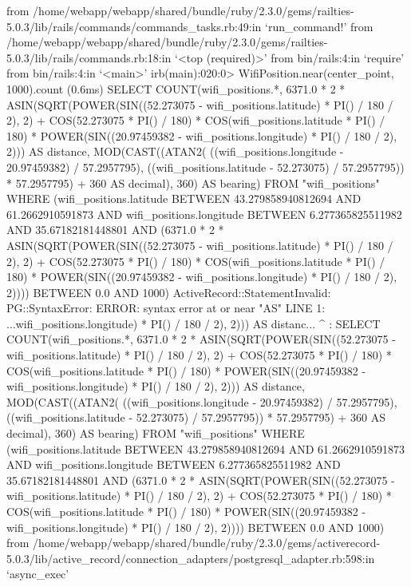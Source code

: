         from /home/webapp/webapp/shared/bundle/ruby/2.3.0/gems/railties-5.0.3/lib/rails/commands/commands_tasks.rb:49:in `run_command!'
        from /home/webapp/webapp/shared/bundle/ruby/2.3.0/gems/railties-5.0.3/lib/rails/commands.rb:18:in `<top (required)>'
        from bin/rails:4:in `require'
        from bin/rails:4:in `<main>'
irb(main):020:0> WifiPosition.near(center_point, 1000).count
   (0.6ms)  SELECT COUNT(wifi_positions.*, 6371.0 * 2 * ASIN(SQRT(POWER(SIN((52.273075 - wifi_positions.latitude) * PI() / 180 / 2), 2) + COS(52.273075 * PI() / 180) * COS(wifi_positions.latitude * PI() / 180) * POWER(SIN((20.97459382 - wifi_positions.longitude) * PI() / 180 / 2), 2))) AS distance, MOD(CAST((ATAN2( ((wifi_positions.longitude - 20.97459382) / 57.2957795), ((wifi_positions.latitude - 52.273075) / 57.2957795)) * 57.2957795) + 360 AS decimal), 360) AS bearing) FROM "wifi_positions" WHERE (wifi_positions.latitude BETWEEN 43.279858940812694 AND 61.2662910591873 AND wifi_positions.longitude BETWEEN 6.277365825511982 AND 35.67182181448801 AND (6371.0 * 2 * ASIN(SQRT(POWER(SIN((52.273075 - wifi_positions.latitude) * PI() / 180 / 2), 2) + COS(52.273075 * PI() / 180) * COS(wifi_positions.latitude * PI() / 180) * POWER(SIN((20.97459382 - wifi_positions.longitude) * PI() / 180 / 2), 2)))) BETWEEN 0.0 AND 1000)
ActiveRecord::StatementInvalid: PG::SyntaxError: ERROR:  syntax error at or near "AS"
LINE 1: ...wifi_positions.longitude) * PI() / 180 / 2), 2))) AS distanc...
                                                             ^
: SELECT COUNT(wifi_positions.*, 6371.0 * 2 * ASIN(SQRT(POWER(SIN((52.273075 - wifi_positions.latitude) * PI() / 180 / 2), 2) + COS(52.273075 * PI() / 180) * COS(wifi_positions.latitude * PI() / 180) * POWER(SIN((20.97459382 - wifi_positions.longitude) * PI() / 180 / 2), 2))) AS distance, MOD(CAST((ATAN2( ((wifi_positions.longitude - 20.97459382) / 57.2957795), ((wifi_positions.latitude - 52.273075) / 57.2957795)) * 57.2957795) + 360 AS decimal), 360) AS bearing) FROM "wifi_positions" WHERE (wifi_positions.latitude BETWEEN 43.279858940812694 AND 61.2662910591873 AND wifi_positions.longitude BETWEEN 6.277365825511982 AND 35.67182181448801 AND (6371.0 * 2 * ASIN(SQRT(POWER(SIN((52.273075 - wifi_positions.latitude) * PI() / 180 / 2), 2) + COS(52.273075 * PI() / 180) * COS(wifi_positions.latitude * PI() / 180) * POWER(SIN((20.97459382 - wifi_positions.longitude) * PI() / 180 / 2), 2)))) BETWEEN 0.0 AND 1000)
        from /home/webapp/webapp/shared/bundle/ruby/2.3.0/gems/activerecord-5.0.3/lib/active_record/connection_adapters/postgresql_adapter.rb:598:in `async_exec'
